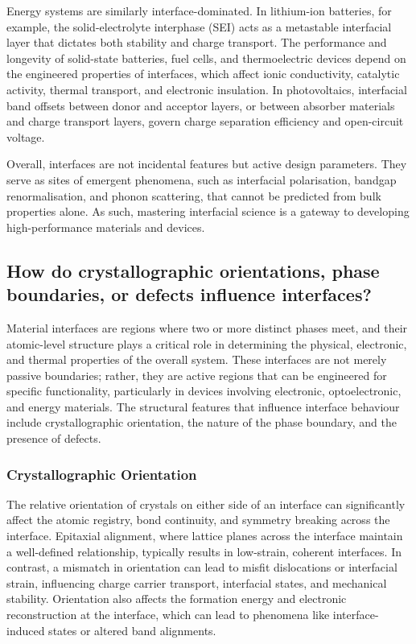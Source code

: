 Energy systems are similarly interface-dominated. In lithium-ion batteries, for example, the solid-electrolyte interphase (SEI) acts as a metastable interfacial layer that dictates both stability and charge transport. The performance and longevity of solid-state batteries, fuel cells, and thermoelectric devices depend on the engineered properties of interfaces, which affect ionic conductivity, catalytic activity, thermal transport, and electronic insulation. In photovoltaics, interfacial band offsets between donor and acceptor layers, or between absorber materials and charge transport layers, govern charge separation efficiency and open-circuit voltage. 
 
Overall, interfaces are not incidental features but active design parameters. They serve as sites of emergent phenomena, such as interfacial polarisation, bandgap renormalisation, and phonon scattering, that cannot be predicted from bulk properties alone. As such, mastering interfacial science is a gateway to developing high-performance materials and devices. 
 
\subsection{How do crystallographic orientations, phase boundaries, or defects influence interfaces?} 
 
Material interfaces are regions where two or more distinct phases meet, and their atomic-level structure plays a critical role in determining the physical, electronic, and thermal properties of the overall system. These interfaces are not merely passive boundaries; rather, they are active regions that can be engineered for specific functionality, particularly in devices involving electronic, optoelectronic, and energy materials. The structural features that influence interface behaviour include crystallographic orientation, the nature of the phase boundary, and the presence of defects. 
 
\subsubsection{Crystallographic Orientation} 
 
The relative orientation of crystals on either side of an interface can significantly affect the atomic registry, bond continuity, and symmetry breaking across the interface. Epitaxial alignment, where lattice planes across the interface maintain a well-defined relationship, typically results in low-strain, coherent interfaces. In contrast, a mismatch in orientation can lead to misfit dislocations or interfacial strain, influencing charge carrier transport, interfacial states, and mechanical stability. Orientation also affects the formation energy and electronic reconstruction at the interface, which can lead to phenomena like interface-induced states or altered band alignments. 
 
